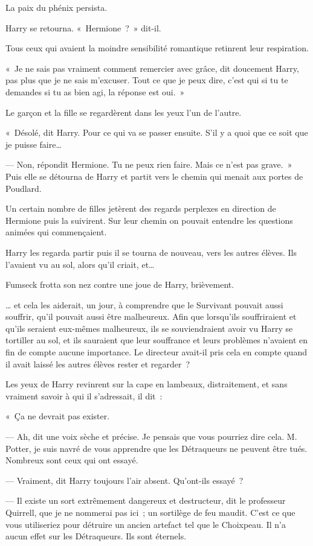 La paix du phénix persista.

Harry se retourna. «~Hermione~?~» dit-il.

Tous ceux qui avaient la moindre sensibilité romantique retinrent leur respiration.

«~Je ne sais pas vraiment comment remercier avec grâce, dit doucement Harry, pas plus que je ne sais m'excuser. Tout ce que je peux dire, c'est qui si tu te demandes si tu as bien agi, la réponse est oui.~»

Le garçon et la fille se regardèrent dans les yeux l'un de l'autre.

«~Désolé, dit Harry. Pour ce qui va se passer ensuite. S'il y a quoi que ce soit que je puisse faire…

--- Non, répondit Hermione. Tu ne peux rien faire. Mais ce n'est pas grave.~» Puis elle se détourna de Harry et partit vers le chemin qui menait aux portes de Poudlard.

Un certain nombre de filles jetèrent des regards perplexes en direction de Hermione puis la suivirent. Sur leur chemin on pouvait entendre les questions animées qui commençaient.

Harry les regarda partir puis il se tourna de nouveau, vers les autres élèves. Ils l'avaient vu au sol, alors qu'il criait, et…

Fumseck frotta son nez contre une joue de Harry, brièvement.

… et cela les aiderait, un jour, à comprendre que le Survivant pouvait aussi souffrir, qu'il pouvait aussi être malheureux. Afin que lorsqu'ils souffriraient et qu'ils seraient eux-mêmes malheureux, ils se souviendraient avoir vu Harry se tortiller au sol, et ils sauraient que leur souffrance et leurs problèmes n'avaient en fin de compte aucune importance. Le directeur avait-il pris cela en compte quand il avait laissé les autres élèves rester et regarder~?

Les yeux de Harry revinrent sur la cape en lambeaux, distraitement, et sans vraiment savoir à qui il s'adressait, il dit~:

«~Ça ne devrait pas exister.

--- Ah, dit une voix sèche et précise. Je pensais que vous pourriez dire cela. M. Potter, je suis navré de vous apprendre que les Détraqueurs ne peuvent être tués. Nombreux sont ceux qui ont essayé.

--- Vraiment, dit Harry toujours l'air absent. Qu'ont-ils essayé~?

--- Il existe un sort extrêmement dangereux et destructeur, dit le professeur Quirrell, que je ne nommerai pas ici~; un sortilège de feu maudit. C'est ce que vous utiliseriez pour détruire un ancien artefact tel que le Choixpeau. Il n'a aucun effet sur les Détraqueurs. Ils sont éternels.

